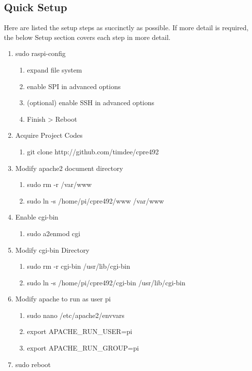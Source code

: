 \documentclass{article}	%
\begin{document}
\begin{multicols}{2}
\subsection{Quick Setup}
Here are listed the setup steps
as succinctly as possible.
If more detail is required,
the below Setup section covers
each step in more detail.
\begin{enumerate}
\item sudo raspi-config
    \begin{enumerate}
    \item expand file system
    \item enable SPI in advanced options
    \item (optional) enable SSH in advanced options
    \item Finish > Reboot
    \end{enumerate}

\item Acquire Project Codes
    \begin{enumerate}
    \item git clone http://github.com/timdee/cpre492
    \end{enumerate}

\item Modify apache2 document directory
    \begin{enumerate}
    \item sudo rm -r /var/www
    \item sudo ln -s /home/pi/cpre492/www /var/www
    \end{enumerate}

\item Enable cgi-bin
    \begin{enumerate}
    \item sudo a2enmod cgi
    \end{enumerate}

\item Modify cgi-bin Directory
    \begin{enumerate}
    \item sudo rm -r cgi-bin /usr/lib/cgi-bin
    \item sudo ln -s /home/pi/cpre492/cgi-bin /usr/lib/cgi-bin
    \end{enumerate}

\item Modify apache to run as user pi
    \begin{enumerate}
    \item sudo nano /etc/apache2/envvars
    \item export APACHE\_RUN\_USER=pi
    \item export APACHE\_RUN\_GROUP=pi
    \end{enumerate}
\item sudo reboot
\end{enumerate}


\end{multicols}
\end{document}
